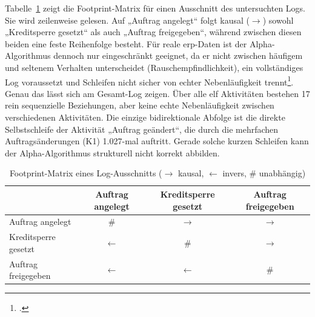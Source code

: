 Tabelle~\ref{tab:footprint} zeigt die Footprint-Matrix für einen Ausschnitt des untersuchten Logs. Sie wird zeilenweise gelesen. Auf „Auftrag angelegt“ folgt kausal ($\rightarrow$) sowohl „Kreditsperre gesetzt“ als auch „Auftrag freigegeben“, während zwischen diesen beiden eine feste Reihenfolge besteht. Für reale \gls{erp}-Daten ist der Alpha-Algorithmus dennoch nur eingeschränkt geeignet, da er nicht zwischen häufigem und seltenem Verhalten unterscheidet (Rauschempfindlichkeit), ein vollständiges Log voraussetzt und Schleifen nicht sicher von echter Nebenläufigkeit trennt\footcite[Vgl.][S.~174 ff.\ und S.~190 ff.]{vanderaalst2016processmining}. Genau das lässt sich am Gesamt-Log zeigen. Über alle elf Aktivitäten bestehen 17 rein sequenzielle Beziehungen, aber keine echte Nebenläufigkeit zwischen verschiedenen Aktivitäten. Die einzige bidirektionale Abfolge ist die direkte Selbstschleife der Aktivität „Auftrag geändert“, die durch die mehrfachen Auftragsänderungen (K1) 1.027-mal auftritt. Gerade solche kurzen Schleifen kann der Alpha-Algorithmus strukturell nicht korrekt abbilden.

\begin{table}[!htb]
\centering
\caption{Footprint-Matrix eines Log-Ausschnitts ($\rightarrow$ kausal, $\leftarrow$ invers, \# unabhängig)}\label{tab:footprint}
\small
\begin{tabular}{@{}l c c c@{}}
\toprule
 & \textbf{Auftrag angelegt} & \textbf{Kreditsperre gesetzt} & \textbf{Auftrag freigegeben} \\
\midrule
Auftrag angelegt & \# & $\rightarrow$ & $\rightarrow$ \\
Kreditsperre gesetzt & $\leftarrow$ & \# & $\rightarrow$ \\
Auftrag freigegeben & $\leftarrow$ & $\leftarrow$ & \# \\
\bottomrule
\end{tabular}
\end{table}

